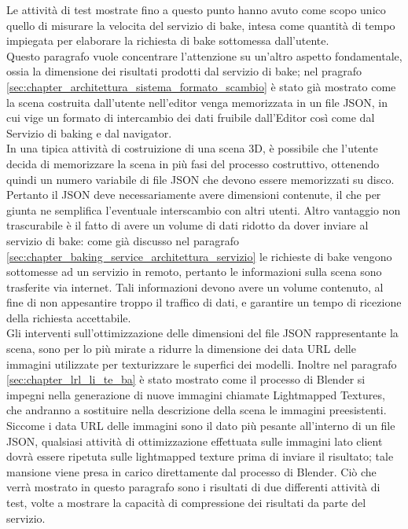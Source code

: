 Le attività di test mostrate fino a questo punto hanno avuto come scopo unico quello di misurare la velocita del servizio di bake, intesa come quantità di tempo impiegata per elaborare la richiesta di bake sottomessa dall’utente. 
\\
Questo paragrafo vuole concentrare l’attenzione su un’altro aspetto fondamentale, ossia la dimensione dei risultati prodotti dal servizio di bake; nel pragrafo \ref{sec:chapter_architettura_sistema_formato_scambio} è stato già mostrato come la scena costruita dall’utente nell’editor venga memorizzata in un file JSON, in cui vige un formato di intercambio dei dati fruibile dall’Editor così come dal Servizio di baking e dal navigator.
\\
In una tipica attività di costruizione di una scena 3D, è possibile che l’utente decida di memorizzare la scena in più fasi del processo costruttivo, ottenendo quindi un numero variabile di file JSON che devono essere memorizzati su disco. Pertanto il JSON deve necessariamente avere dimensioni contenute, il che per giunta ne semplifica l’eventuale interscambio con altri utenti.
Altro vantaggio non trascurabile è il fatto di avere un volume di dati ridotto da dover inviare al servizio di bake: come già discusso nel paragrafo \ref{sec:chapter_baking_service_architettura_servizio} le richieste di bake vengono sottomesse ad un servizio in remoto, pertanto le informazioni sulla scena sono trasferite via internet. Tali informazioni devono avere un volume contenuto, al fine di non appesantire troppo il traffico di dati, e garantire un tempo di ricezione della richiesta accettabile. 
\\
Gli interventi sull’ottimizzazione delle dimensioni del file JSON rappresentante la scena, sono per lo più mirate a ridurre la dimensione dei data URL delle immagini utilizzate per texturizzare le superfici dei modelli.
Inoltre nel paragrafo \ref{sec:chapter_lrl_li_te_ba} è stato mostrato come il processo di Blender si impegni nella generazione di nuove immagini chiamate Lightmapped Textures, che andranno a sostituire nella descrizione della scena le immagini preesistenti.
Siccome i data URL delle immagini sono il dato più pesante all’interno di un file JSON, qualsiasi attività di ottimizzazione effettuata sulle immagini lato client dovrà essere ripetuta sulle lightmapped texture prima di inviare il risultato; tale mansione viene presa in carico direttamente dal processo di Blender.
Ciò che verrà mostrato in questo paragrafo sono i risultati di due differenti attività di test, volte a mostrare la capacità di compressione dei risultati da parte del servizio.
